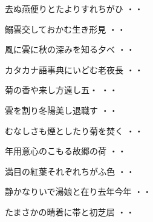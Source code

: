 \vspace{0.6cm}
\begin{shiika}去ぬ燕便りとたよりすれちがひ
\hfill{・・}\end{shiika}
\vspace{0.6cm}
\begin{shiika}鰯雲交しておかむ生き形見
\hfill{・・}\end{shiika}
\vspace{0.6cm}
\begin{shiika}風に雲に秋の深みを知る夕べ
\hfill{・・}\end{shiika}
\vspace{0.6cm}
\begin{shiika}カタカナ語事典にいどむ老夜長
\hfill{・・}\end{shiika}
\vspace{0.6cm}
\begin{shiika}菊の香や来し方遠し五・
\hfill{・・}\end{shiika}
\vspace{0.6cm}
\begin{shiika}雲を割り冬陽美し退職す
\hfill{・・}\end{shiika}
\vspace{0.6cm}
\begin{shiika}むなしさも煙としたり菊を焚く
\hfill{・・}\end{shiika}
\vspace{0.6cm}
\begin{shiika}年用意心のこもる故郷の荷
\hfill{・・}\end{shiika}
\vspace{0.6cm}
\begin{shiika}満目の紅葉それぞれちがふ色
\hfill{・・}\end{shiika}
\vspace{0.6cm}
\begin{shiika}静かなりいで湯娘と在り去年今年
\hfill{・・}\end{shiika}
\vspace{0.6cm}
\begin{shiika}たまさかの晴着に帯と初芝居
\hfill{・・}\end{shiika}
